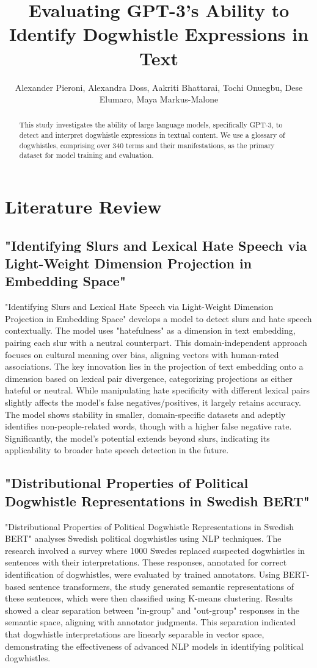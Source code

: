 \documentclass[11pt]{article}
\title{Evaluating GPT-3's Ability to Identify Dogwhistle Expressions in Text}
\author{Alexander Pieroni, Alexandra Doss, Aakriti Bhattarai,  Tochi Onuegbu, Dese Elumaro, Maya Markus-Malone}
\begin{document}
\maketitle
\begin{abstract}
  This study investigates the ability of large language models, specifically GPT-3, to detect and interpret dogwhistle expressions in textual content. We use a glossary of dogwhistles, comprising over 340 terms and their manifestations, as the primary dataset for model training and evaluation.
\end{abstract}


\section{Literature Review}
\subsection{"Identifying Slurs and Lexical Hate Speech via Light-Weight Dimension Projection in Embedding Space"}
"Identifying Slurs and Lexical Hate Speech via Light-Weight Dimension Projection in Embedding Space" \cite{hoeken2023identifying} develops a model to detect slurs and hate speech contextually. The model uses "hatefulness" as a dimension in text embedding, pairing each slur with a neutral counterpart. This domain-independent approach focuses on cultural meaning over bias, aligning vectors with human-rated associations. The key innovation lies in the projection of text embedding onto a dimension based on lexical pair divergence, categorizing projections as either hateful or neutral. While manipulating hate specificity with different lexical pairs slightly affects the model's false negatives/positives, it largely retains accuracy. The model shows stability in smaller, domain-specific datasets and adeptly identifies non-people-related words, though with a higher false negative rate. Significantly, the model's potential extends beyond slurs, indicating its applicability to broader hate speech detection in the future.

\subsection{"Distributional Properties of Political Dogwhistle Representations in Swedish BERT"}
"Distributional Properties of Political Dogwhistle Representations in Swedish BERT" \cite{hertzberg2022distributional} analyses Swedish political dogwhistles using NLP techniques. The research involved a survey where 1000 Swedes replaced suspected dogwhistles in sentences with their interpretations. These responses, annotated for correct identification of dogwhistles, were evaluated by trained annotators. Using BERT-based sentence transformers, the study generated semantic representations of these sentences, which were then classified using K-means clustering. Results showed a clear separation between "in-group" and "out-group" responses in the semantic space, aligning with annotator judgments. This separation indicated that dogwhistle interpretations are linearly separable in vector space, demonstrating the effectiveness of advanced NLP models in identifying political dogwhistles.
\end{document}
